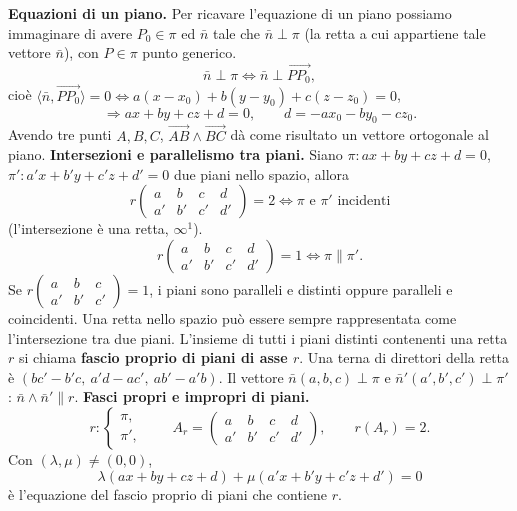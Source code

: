 \documentclass[11pt,a4paper]{article}
\newcommand{\pagina}[1]{\clearpage}
\begin{document}
\textbf{Equazioni di un piano.} Per ricavare l'equazione di un piano possiamo immaginare di avere $P_0\in\pi$ ed $\bar n$ tale che $\bar n\perp\pi$ (la retta a cui appartiene tale vettore $\bar n$), con $P\in\pi$ punto generico.
\[\bar n\perp\pi\Longleftrightarrow\bar n\perp\overrightarrow{PP_0},\]
cioè $\langle\bar n,\overrightarrow{PP_0}\rangle=0\Longleftrightarrow a(x-x_0)+b(y-y_0)+c(z-z_0)=0$,
\[\Longrightarrow ax+by+cz+d=0,\qquad d=-ax_0-by_0-cz_0.\]
Avendo tre punti $A,B,C$, $\overrightarrow{AB}\wedge\overrightarrow{BC}$ dà come risultato un vettore ortogonale al piano.
\textbf{Intersezioni e parallelismo tra piani.} Siano $\pi:ax+by+cz+d=0$, $\pi':a'x+b'y+c'z+d'=0$ due piani nello spazio, allora
\[r\begin{pmatrix}a&b&c&d\\a'&b'&c'&d'\end{pmatrix}=2\Longleftrightarrow\pi\text{ e }\pi'\text{ incidenti}\]
(l'intersezione è una retta, $\infty^1$).
\pagina{64}
\[r\begin{pmatrix}a&b&c&d\\a'&b'&c'&d'\end{pmatrix}=1\Longleftrightarrow\pi\parallel\pi'.\]
Se $r\begin{pmatrix}a&b&c\\a'&b'&c'\end{pmatrix}=1$, i piani sono paralleli e distinti oppure paralleli e coincidenti.
Una retta nello spazio può essere sempre rappresentata come l'intersezione tra due piani.
L'insieme di tutti i piani distinti contenenti una retta $r$ si chiama \textbf{fascio proprio di piani di asse $r$}.
Una terna di direttori della retta è $(bc'-b'c,\ a'd-ac',\ ab'-a'b)$.
Il vettore $\bar n(a,b,c)\perp\pi$ e $\bar n'(a',b',c')\perp\pi'$: $\bar n\wedge\bar n'\parallel r$.
\textbf{Fasci propri e impropri di piani.}
\[r:\begin{cases}\pi,\\\pi',\end{cases}\qquad A_r=\begin{pmatrix}a&b&c&d\\a'&b'&c'&d'\end{pmatrix},\qquad r(A_r)=2.\]
Con $(\lambda,\mu)\ne(0,0)$,
\[\lambda(ax+by+cz+d)+\mu(a'x+b'y+c'z+d')=0\]
è l'equazione del fascio proprio di piani che contiene $r$.
\end{document}
